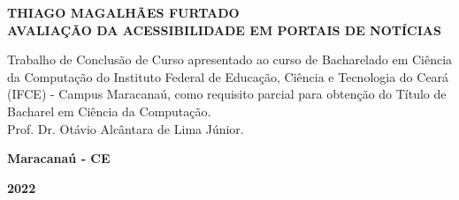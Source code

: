\documentclass[a4paper]{article}
\begin{document}
\begin{titlepage}
	\vfill
	\begin{center}
		\onehalfspacing
		\fontsize{12pt}{0pt}\selectfont
		{\large \textbf{THIAGO MAGALHÃES FURTADO}} \\[1.5cm]
		\fontsize{12pt}{0pt}\selectfont
		{\large \textbf{AVALIAÇÃO DA ACESSIBILIDADE EM PORTAIS DE NOTÍCIAS}}\\[3cm]
		
		\hspace{.45\textwidth} %
		\begin{minipage}{.5\textwidth}
			\large Trabalho de Conclusão de Curso apresentado ao curso de Bacharelado em Ciência da Computação do Instituto Federal de Educação, Ciência e Tecnologia do Ceará (IFCE) - Campus Maracanaú, como requisito parcial para obtenção do Título de Bacharel em Ciência da Computação.\\[1cm]
			Prof. Dr. Otávio Alcântara de Lima Júnior.
		\end{minipage}
		\vfill
		\vspace{2cm}		
		\large \textbf{Maracanaú - CE}
		
		\large \textbf{2022}
	\end{center}
\end{titlepage}
\end{document}
